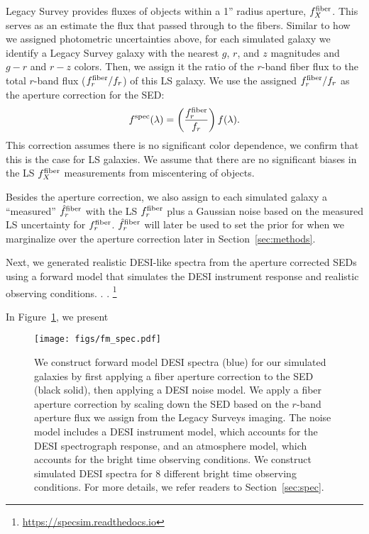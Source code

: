 Legacy Survey provides fluxes of objects within a 1'' radius aperture,
$f_X^{\rm fiber}$. This serves as an estimate the flux that passed through to
the fibers. Similar to how we assigned photometric uncertainties above, for
each simulated galaxy we identify a Legacy Survey galaxy with the nearest
$g$, $r$, and $z$ magnitudes and $g - r$ and $r - z$ colors. Then, we assign 
it the ratio of the $r$-band fiber flux to the total $r$-band flux 
($f_r^{\rm fiber}/f_r$) of this LS galaxy. We use the assigned
$f_r^{\rm fiber}/f_r$ as the aperture correction for the SED: 
\begin{equation}
    f^{\rm spec}(\lambda) = \left(\frac{f_r^{\rm fiber}}{f_r}\right)f(\lambda).
\end{equation}
This correction assumes there is no significant color dependence, we confirm
that this is the case for LS galaxies. We assume that there are no significant
biases in the LS $f_X^{\rm fiber}$ measurements from miscentering 
of objects.   

Besides the aperture correction, we also assign to each simulated galaxy a
``measured'' $\hat{f}_r^{\rm fiber}$ with the LS $f_r^{\rm fiber}$ plus a 
Gaussian noise based on the measured LS uncertainty for $f_r^{\rm fiber}$.
$\hat{f}_r^{\rm fiber}$ will later be used to set the prior for when we
marginalize over the aperture correction later in Section~\ref{sec:methods}.

Next, we generated realistic DESI-like spectra from the aperture corrected SEDs
using a forward model that simulates the DESI instrument response and realistic
observing conditions. . .   
\footnote{\href{https://specsim.readthedocs.io/en/stable/guide.html}{https://specsim.readthedocs.io}}

In Figure~\ref{fig:spec}, we present 

\begin{figure}
\begin{center}
\texttt{[image: figs/fm\_spec.pdf]} 
\caption{We construct forward model DESI spectra (blue) for our simulated galaxies by first
applying a fiber aperture correction to the SED (black solid), then applying a DESI noise model. 
We apply a fiber aperture correction by scaling down the SED based on the $r$-band aperture
flux we assign from the Legacy Surveys imaging. The noise model includes a DESI instrument 
model, which accounts for the DESI spectrograph response, and an atmosphere model, which 
accounts for the bright time observing conditions. We construct simulated DESI spectra for 
8 different bright time observing conditions. For more details, we refer readers to Section~\ref{sec:spec}.
}
\label{fig:spec}
\end{center}
\end{figure}

